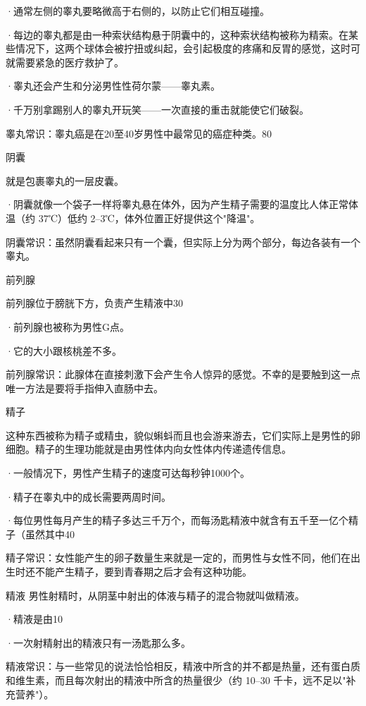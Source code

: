 \documentclass[12pt,UTF8,openany]{ctexbook}
\begin{document}
·通常左侧的睾丸要略微高于右侧的，以防止它们相互碰撞。

·每边的睾丸都是由一种索状结构悬于阴囊中的，这种索状结构被称为精索。在某些情况下，这两个球体会被拧扭或纠起，会引起极度的疼痛和反胃的感觉，这时可就需要紧急的医疗救护了。

·睾丸还会产生和分泌男性性荷尔蒙——睾丸素。

·千万别拿踢别人的睾丸开玩笑——一次直接的重击就能使它们破裂。

睾丸常识：睾丸癌是在20至40岁男性中最常见的癌症种类。80%

阴囊

就是包裹睾丸的一层皮囊。

·阴囊就像一个袋子一样将睾丸悬在体外，因为产生精子需要的温度比人体正常体温（约 37℃）低约 2–3℃，体外位置正好提供这个"降温"。

阴囊常识：虽然阴囊看起来只有一个囊，但实际上分为两个部分，每边各装有一个睾丸。

前列腺

前列腺位于膀胱下方，负责产生精液中30%

·前列腺也被称为男性G点。

·它的大小跟核桃差不多。

前列腺常识：此腺体在直接刺激下会产生令人惊异的感觉。不幸的是要触到这一点唯一方法是要将手指伸入直肠中去。

精子

这种东西被称为精子或精虫，貌似蝌蚪而且也会游来游去，它们实际上是男性的卵细胞。精子的生理功能就是由男性体内向女性体内传递遗传信息。

·一般情况下，男性产生精子的速度可达每秒钟1000个。

·精子在睾丸中的成长需要两周时间。

·每位男性每月产生的精子多达三千万个，而每汤匙精液中就含有五千至一亿个精子（虽然其中40%

精子常识：女性能产生的卵子数量生来就是一定的，而男性与女性不同，他们在出生时还不能产生精子，要到青春期之后才会有这种功能。

精液
男性射精时，从阴茎中射出的体液与精子的混合物就叫做精液。

·精液是由10%

·一次射精射出的精液只有一汤匙那么多。

精液常识：与一些常见的说法恰恰相反，精液中所含的并不都是热量，还有蛋白质和维生素，而且每次射出的精液中所含的热量很少（约 10–30 千卡，远不足以"补充营养"）。
\end{document}
